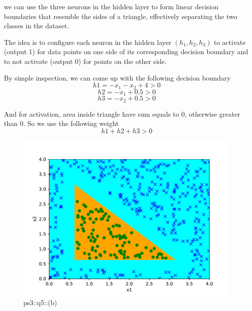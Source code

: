 \begin{answer}

we can use the three neurons in the hidden layer to form linear decision boundaries that resemble the sides of a triangle, effectively separating the two classes in the dataset.

The idea is to configure each neuron in the hidden layer $(h_1, h_2, h_3)$ to activate (output 1) for data points on one side of its corresponding decision boundary and to not activate (output 0) for points on the other side. 

By simple inspection, we can come up with the following decision boundary
\begin{equation}
    h1 = -x_1 - x_2 + 4 > 0 
\end{equation}
\begin{equation}
    h2 = - x_1 + 0.5 > 0
\end{equation}
\begin{equation}
    h3 = -x_2 + 0.5 > 0 
\end{equation}

And for activation, area inside triangle have sum equals to 0, otherwise greater than 0. So we use the following weight
\begin{equation}
    h1 + h2 + h3 > 0
\end{equation}

\begin{figure}[H]
    \centering
    \includegraphics[width=0.5\linewidth]{step_weights.pdf}
    \caption{ps3::q5::(b)}
    \label{fig:enter-label}
\end{figure}
\end{answer}
